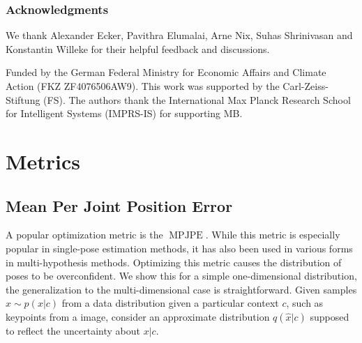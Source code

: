 \documentclass{article} \usepackage{iclr2023_conference,times}
\begin{document}
\subsubsection*{Acknowledgments}
We thank Alexander Ecker, Pavithra Elumalai, Arne Nix, Suhas Shrinivasan and Konstantin Willeke for their helpful feedback and discussions.

Funded by the German Federal Ministry for Economic Affairs and Climate Action (FKZ ZF4076506AW9). This work was supported by the Carl-Zeiss-Stiftung (FS). The authors thank the International Max Planck Research School for Intelligent Systems (IMPRS-IS)
for supporting MB.




\appendix
\renewcommand{\figurename}{Supplementary Figure}
\renewcommand{\tablename}{Supplementary Table}
\section{Metrics}
\subsection{Mean Per Joint Position Error}
\label{app_seq:mpjpe}
A popular optimization metric is the $\operatorname{MPJPE}$.
While this metric is especially popular in single-pose estimation methods, it has also been used in various forms in multi-hypothesis methods.
Optimizing this metric causes the distribution of poses to be overconfident.
We show this for a simple one-dimensional distribution, the generalization to the multi-dimensional case is straightforward. 
Given samples $x\sim p(x\vert c)$ from a data distribution given a particular context $c$, such as keypoints from a image,  consider an approximate distribution $q(\hat{x}\vert c)$ supposed to reflect the uncertainty about $x|c$. 
\end{document}
